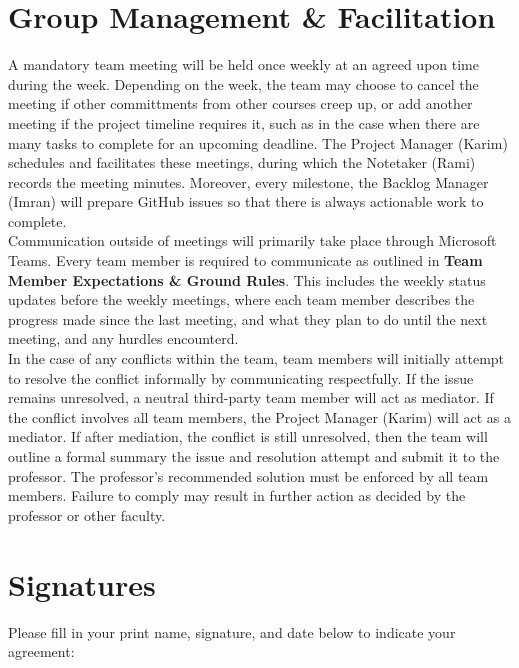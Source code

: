 \documentclass[12pt]{article}
\begin{document}
\section*{Group Management \& Facilitation}
A mandatory team meeting will be held once weekly at an agreed upon time during the week. Depending on the week, the team may choose to cancel the meeting if other committments from other courses creep up, or add another meeting if the project timeline
requires it, such as in the case when there are many tasks to complete for an upcoming deadline. The Project Manager (Karim) schedules and facilitates these meetings, during which the Notetaker (Rami) records the meeting minutes.
Moreover, every milestone, the Backlog Manager (Imran) will prepare GitHub issues so that there is always actionable work to complete.\\

\noindent Communication outside of meetings will primarily take place through Microsoft Teams. Every team member is required to communicate as outlined in \textbf{Team Member Expectations \& Ground Rules}. This includes the weekly status updates before the weekly meetings, where each team member
describes the progress made since the last meeting, and what they plan to do until the next meeting, and any hurdles encounterd.\\

\noindent In the case of any conflicts within the team, team members will initially attempt to resolve the conflict informally by communicating respectfully. If the issue remains unresolved, a neutral third-party team member will act as mediator. If the conflict involves all team members, the Project Manager (Karim)
will act as a mediator. If after mediation, the conflict is still unresolved, then the team will outline a formal summary the issue and resolution attempt and submit it to the professor. The professor's recommended solution must be enforced by all team members. Failure to comply may result in further action
as decided by the professor or other faculty.
\section*{Signatures}
\bigskip

Please fill in your print name, signature, and date below to indicate your agreement:
\end{document}
